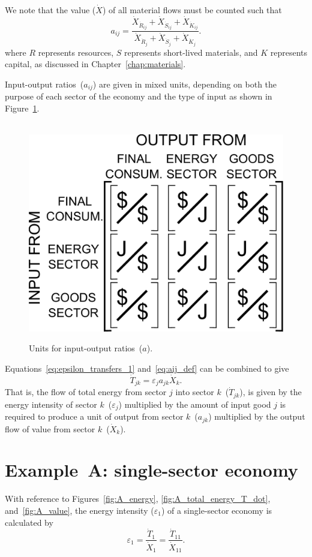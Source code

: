 We note that the value ($\dot{X}$) of all material flows must be counted such that
%
\begin{equation} \label{eq:aij_def_expanded}
	a_{ij} =	 
	\frac{\dot{X}_{\dot{R}_{ij}} + \dot{X}_{\dot{S}_{ij}} + \dot{X}_{\dot{K}_{ij}}}
		{\dot{X}_{\dot{R}_{j}} + \dot{X}_{\dot{S}_{j}} + \dot{X}_{\dot{K}_{j}}}.
\end{equation}
%
where $R$ represents resources,
$S$ represents short-lived materials, and
$K$ represents capital,
as discussed in Chapter~\ref{chap:materials}.

Input-output ratios~($a_{ij}$) are given in mixed units, 
depending on both the purpose of each sector of the economy 
and the type of input as shown in Figure~\ref{fig:A_matrix_units}.

\begin{figure}[ht!]
\centering\
\includegraphics[width=0.4\linewidth]{Part_2/Chapter_Intensity/images/I-O_units.pdf}
\caption[Units for input-output ratios]{Units for input-output 
ratios~($a$).}
\label{fig:A_matrix_units}
\end{figure}

Equations~\ref{eq:epsilon_transfers_1} and~\ref{eq:aij_def} can be combined to give
%
\begin{equation}
	\dot{T}_{jk} = \varepsilon_{j} a_{jk} \dot{X}_{k}.
\end{equation}
%
That is,
the flow of total energy from sector $j$ into sector $k$~($\dot{T}_{jk}$),
is given by the energy intensity of sector $k$~($\varepsilon_{j}$)
multiplied by the amount of input good $j$ is required 
to produce a unit of output from sector $k$~($a_{jk}$)
multiplied by the output flow of value from sector $k$~($\dot{X}_{k}$).


\section{Example~A: single-sector economy} %

With reference to Figures~\ref{fig:A_energy}, 
\ref{fig:A_total_energy_T_dot}, 
and~\ref{fig:A_value},
the energy intensity ($\varepsilon_{1}$) of a single-sector economy is calculated by
%
\begin{equation} \label{eq:A-energy_intensity}
	\varepsilon_{1} 
	= \frac{\dot{T}_{1}}{\dot{X}_{1}} 
	= \frac{\dot{T}_{11}}{\dot{X}_{11}}.
\end{equation}

